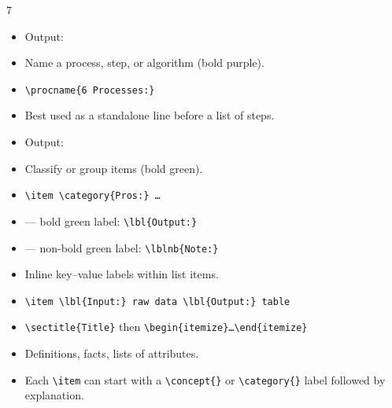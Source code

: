 \documentclass[a4paper,landscape]{article}
\begin{document}
\begin{multicols}{7}
\begin{itemize}
\item Output: 
\item {} Name a process, step, or algorithm (bold purple).
\item {} \texttt{\textbackslash procname\{6 Processes:\}}
\item Best used as a standalone line before a list of steps.
\end{itemize}

\begin{itemize}
\item Output: 
\item {} Classify or group items (bold green).
\item {} \texttt{\textbackslash item \textbackslash category\{Pros:\} …}
\end{itemize}

\begin{itemize}
\item {} — bold green label: \texttt{\textbackslash lbl\{Output:\}}
\item {} — non-bold green label: \texttt{\textbackslash lblnb\{Note:\}}
\item {} Inline key–value labels within list items.
\item {} \texttt{\textbackslash item \textbackslash lbl\{Input:\} raw data \quad \textbackslash lbl\{Output:\} table}
\end{itemize}



\begin{itemize}
\item {} \texttt{\textbackslash sectitle\{Title\}} then \texttt{\textbackslash begin\{itemize\}…\textbackslash end\{itemize\}}
\item {} Definitions, facts, lists of attributes.
\item Each \texttt{\textbackslash item} can start with a \texttt{\textbackslash concept\{\}} or \texttt{\textbackslash category\{\}} label followed by explanation.
\end{itemize}


\end{multicols}
\end{document}
